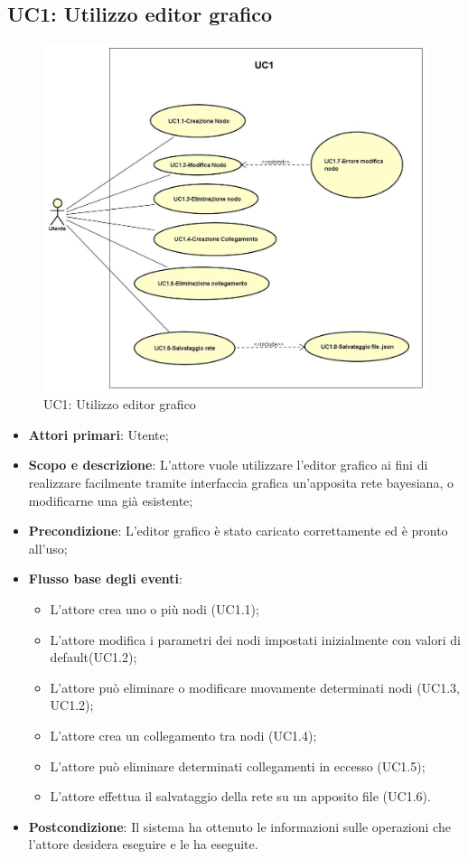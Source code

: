 \subsection{UC1: Utilizzo editor grafico}
\hypertarget{UC1}{} 
\begin{figure} [H]
	\centering
	\includegraphics[scale=0.45]{Img/UC1} 
	\caption{UC1: Utilizzo editor grafico} \label{} 
\end{figure} 
\begin{itemize} 
	\item{\textbf{Attori primari}: Utente;}
	\item{\textbf{Scopo e descrizione}: L'attore vuole utilizzare l'editor grafico ai fini di realizzare facilmente tramite interfaccia grafica un'apposita rete bayesiana, o modificarne una già esistente;} 
	\item{\textbf{Precondizione}: L'editor grafico è stato caricato correttamente ed è pronto all'uso;} 
	\item{\textbf{Flusso base degli eventi}: 
		\begin{itemize} 
			\item{L'attore crea uno o più nodi (UC1.1);} 
			\item{L'attore modifica i parametri dei nodi impostati inizialmente con valori di default(UC1.2);} 
			\item{L'attore può eliminare o modificare nuovamente determinati nodi (UC1.3, UC1.2)}; 
			\item{L'attore crea un collegamento tra nodi (UC1.4);} 
			\item{L'attore può eliminare determinati collegamenti in eccesso (UC1.5);} 
			\item{L'attore effettua il salvataggio della rete su un apposito file (UC1.6).} 
		\end{itemize} 
	} 
	\item{\textbf{Postcondizione}: Il sistema ha ottenuto le informazioni sulle operazioni che l'attore desidera eseguire e le ha eseguite.} 
\end{itemize} 
